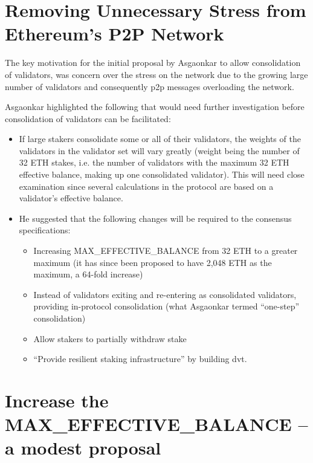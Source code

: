 \documentclass[UTF8]{article}
\begin{document}
\section{Removing Unnecessary Stress from Ethereum’s P2P Network}
\label{sec:initial}
The key motivation for the initial proposal by Asgaonkar \cite{Asgaonkar2023} to allow consolidation of validators, was concern over the stress on the network due to the growing large number of validators and consequently \gls{p2p} messages overloading the network. 

Asgaonkar \cite{Asgaonkar2023} highlighted the following that would need further investigation before consolidation of validators can be facilitated:
\begin{itemize}
\item If large stakers consolidate some or all of their validators, the weights of the validators in the validator set will vary greatly (weight being the number of 32 ETH stakes, i.e. the number of validators with the maximum 32 ETH effective balance, making up one consolidated validator). This will need close examination since several calculations in the protocol are based on a validator's effective balance.
\item He suggested that the following changes will be required to the consensus specifications:
\begin{itemize}
\item Increasing MAX\_EFFECTIVE\_BALANCE from 32 ETH to a greater maximum (it has since been proposed to have 2,048 ETH as the maximum, a 64-fold increase)
\item Instead of validators exiting and re-entering as consolidated validators, providing in-protocol consolidation (what Asgaonkar termed ``one-step'' consolidation)
\item Allow stakers to partially withdraw stake
\item ``Provide resilient staking infrastructure'' by building \gls{dvt}.
\end{itemize}

\end{itemize}

\section{Increase the MAX\_EFFECTIVE\_BALANCE – a modest proposal}
\label{sec:modest}
\end{document}
